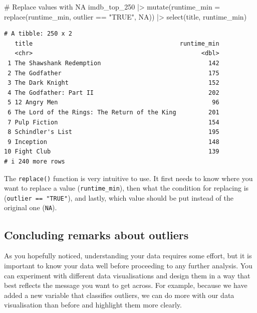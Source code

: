 \documentclass[
  letterpaper,
]{krantz}
\makeatletter
\newenvironment{Shaded}{\begin{snugshade}}{\end{snugshade}}
\newcommand{\AttributeTok}[1]{\textcolor[rgb]{0.40,0.45,0.13}{#1}}
\newcommand{\CommentTok}[1]{\textcolor[rgb]{0.37,0.37,0.37}{#1}}
\newcommand{\ConstantTok}[1]{\textcolor[rgb]{0.56,0.35,0.01}{#1}}
\newcommand{\FunctionTok}[1]{\textcolor[rgb]{0.28,0.35,0.67}{#1}}
\newcommand{\NormalTok}[1]{\textcolor[rgb]{0.00,0.23,0.31}{#1}}
\newcommand{\SpecialCharTok}[1]{\textcolor[rgb]{0.37,0.37,0.37}{#1}}
\newcommand{\StringTok}[1]{\textcolor[rgb]{0.13,0.47,0.30}{#1}}
\newenvironment{kframe}{%
\medskip{}
\setlength{\fboxsep}{.8em}
 \def\at@end@of@kframe{}%
 \ifinner\ifhmode%
  \def\at@end@of@kframe{\end{minipage}}%
  \begin{minipage}{\columnwidth}%
 \fi\fi%
 \def\FrameCommand##1{\hskip\@totalleftmargin \hskip-\fboxsep
 \colorbox{shadecolor}{##1}\hskip-\fboxsep
     \hskip-\linewidth \hskip-\@totalleftmargin \hskip\columnwidth}%
 \MakeFramed {\advance\hsize-\width
   \@totalleftmargin\z@ \linewidth\hsize
   \@setminipage}}%
 {\par\unskip\endMakeFramed%
 \at@end@of@kframe}
\renewenvironment{Shaded}{\begin{kframe}}{\end{kframe}}
\makeatother
\begin{document}
\begin{Shaded}
\begin{Highlighting}[]
\CommentTok{\# Replace values with NA}
\NormalTok{imdb\_top\_250 }\SpecialCharTok{|\textgreater{}}
  \FunctionTok{mutate}\NormalTok{(}\AttributeTok{runtime\_min =} \FunctionTok{replace}\NormalTok{(runtime\_min, outlier }\SpecialCharTok{==} \StringTok{"TRUE"}\NormalTok{, }\ConstantTok{NA}\NormalTok{)) }\SpecialCharTok{|\textgreater{}}
  \FunctionTok{select}\NormalTok{(title, runtime\_min)}
\end{Highlighting}
\end{Shaded}

\begin{verbatim}
# A tibble: 250 x 2
   title                                         runtime_min
   <chr>                                               <dbl>
 1 The Shawshank Redemption                              142
 2 The Godfather                                         175
 3 The Dark Knight                                       152
 4 The Godfather: Part II                                202
 5 12 Angry Men                                           96
 6 The Lord of the Rings: The Return of the King         201
 7 Pulp Fiction                                          154
 8 Schindler's List                                      195
 9 Inception                                             148
10 Fight Club                                            139
# i 240 more rows
\end{verbatim}

The \texttt{replace()} function is very intuitive to use. It first needs
to know where you want to replace a value (\texttt{runtime\_min}), then
what the condition for replacing is (\texttt{outlier\ ==\ "TRUE"}), and
lastly, which value should be put instead of the original one
(\texttt{NA}).

\subsection{Concluding remarks about
outliers}\label{sec-concluding-remarks-outliers}

As you hopefully noticed, understanding your data requires some effort,
but it is important to know your data well before proceeding to any
further analysis. You can experiment with different data visualisations
and design them in a way that best reflects the message you want to get
across. For example, because we have added a new variable that
classifies outliers, we can do more with our data visualisation than
before and highlight them more clearly.
\end{document}
